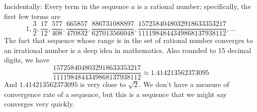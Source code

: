 \documentclass[12pt,fleqn,answers]{exam}
\begin{document}
\begin{questions}
\begin{solution}
Incidentally:  Every term in the sequence $a$ is a rational number; specifically, the first few terms are
\begin{equation*}
1,\frac{3}{2},\frac{17}{12},\frac{577}{408},\frac{665857}{470832},\frac{886731088897}{627013566048},\frac{1572584048032918633353217}{1111984844349868137938112}, \dots
\end{equation*}
The fact that sequence  whose range is in the set of rational number converges to an irrational number is a deep idea in mathematics. Also
rounded to 15 decimal digits, we have
\begin{equation*}
\frac{1572584048032918633353217}{1111984844349868137938112} \approx 1.414213562373095
\end{equation*}
And $1.414213562373095$ is very close to $\sqrt{2}$.  We don't have a measure of  convergence rate of a sequence, but this is a 
sequence that we might say converges very quickly. 
\end{solution}
\end{questions}
\end{document}
